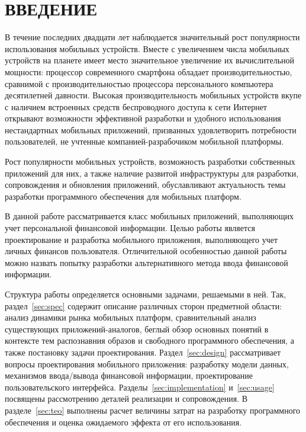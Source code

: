 \section*{ВВЕДЕНИЕ}

В течение последних двадцати лет наблюдается значительный рост
популярности использования мобильных устройств.
Вместе с увеличением числа мобильных устройств на планете имеет место
значительное увеличение их вычислительной мощности:
процессор современного смартфона обладает производительностью,
сравнимой с производительностью процессора персонального
компьютера десятилетней давности.
Высокая производительность мобильных устройств вкупе с наличием
встроенных средств беспроводного доступа к сети Интернет открывают
возможности эффективной разработки и удобного использования
нестандартных мобильных приложений, призванных удовлетворить
потребности пользователей, не учтенные компанией-разрабочиком
мобильной платформы.

Рост популярности мобильных устройств, возможность разработки собственных
приложений для них, а также наличие развитой инфраструктуры для разработки,
сопровождения и обновления приложений, обуславливают актуальность темы
разработки программного обеспечения для мобильных платформ.

В данной работе рассматривается класс мобильных приложений,
выполняющих учет персональной финансовой информации.
Целью работы является проектирование и разработка мобильного приложения,
выполняющего учет личных финансов пользователя.
Отличительной особенностью данной работы можно назвать попытку разработки
альтернативного метода ввода финансовой информации.

Структура работы определяется основными задачами, решаемыми в ней.
Так, раздел~\ref{sec:spec} содержит описание различных сторон предметной области:
анализ динамики рынка мобильных платформ, сравнительный анализ существующих
приложений-аналогов, беглый обзор основных понятий в контексте тем распознавния
образов и свободного программного обеспечения, а также постановку задачи проектирования.
Раздел~\ref{sec:design} рассматривает вопросы проектирования мобильного приложения:
разработку модели данных, механизмов ввода/вывода финансовой информации,
проектирование пользовательского интерфейса.
Разделы~\ref{sec:implementation} и~\ref{sec:usage} посвящены рассмотрению деталей
реализации и сопровождения. В разделе~\ref{sec:teo} выполнены расчет
величины затрат на разработку программного обеспечения и оценка ожидаемого эффекта
от его использования.
